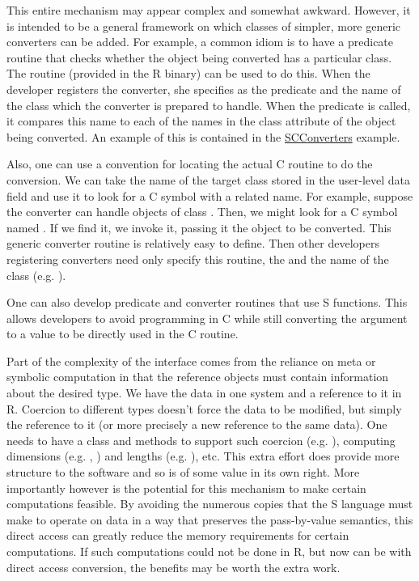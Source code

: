 \documentclass{article}
\begin{document}
This entire mechanism may appear complex and somewhat awkward.
However, it is intended to be a general framework on which classes of
simpler, more generic converters can be added.  For example, a common
idiom is to have a predicate routine that checks whether the object
being converted has a particular class.  The routine
 (provided in the R binary) can be used to do
this.  When the developer registers the converter, she specifies
 as the predicate and the name of the class
which the converter is prepared to handle.  When the predicate is
called, it compares this name to each of the names in the class
attribute of the object being converted.  An example of this is
contained in the
\href{http://cm.bell-labs.com/stat/duncan/SCConverters/SCConverters_1.0-0.tar.gz}{SCConverters}
example.


Also, one can use a convention for locating the actual C routine to do
the conversion. We can take the name of the target class stored in the
user-level data field and use it to look for a C symbol with a related
name.  For example, suppose the converter can handle objects of class
. Then, we might look for a C symbol named
. If we find it, we invoke it, passing it the
object to be converted.  This generic converter routine is relatively
easy to define. Then other developers registering converters need only
specify this routine, the  and the name of the
class (e.g. ).

One can also develop predicate and converter routines that use S
functions.  This allows developers to avoid programming in C while
still converting the argument to a value to be directly used in the C
routine.


Part of the complexity of the interface comes from the reliance on
meta or symbolic computation in that the reference objects must
contain information about the desired type. We have the data in one
system and a reference to it in R. Coercion to different types doesn't
force the data to be modified, but simply the reference to it (or more
precisely a new reference to the same data).  One needs to have a
class and methods to support such coercion
(e.g. ), computing dimensions
(e.g. , ) and lengths
(e.g. ), etc. This extra effort does provide more
structure to the software and so is of some value in its own
right. More importantly however is the potential for this mechanism to
make certain computations feasible.  By avoiding the numerous copies
that the S language must make to operate on data in a way that
preserves the pass-by-value semantics, this direct access can greatly
reduce the memory requirements for certain computations. If such
computations could not be done in R, but now can be with direct access
conversion, the benefits may be worth the extra work.
\end{document}
